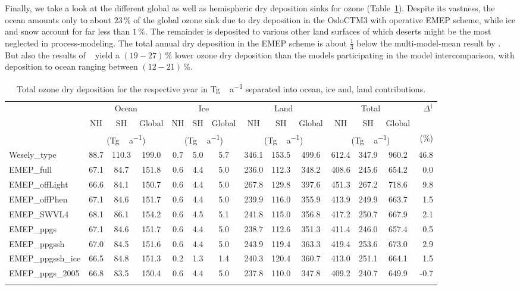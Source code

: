 \documentclass[gmd, manuscript]{copernicus}
\begin{document}
Finally, we take a look at the different global as well as hemispheric dry deposition sinks for ozone (Table~\ref{tab:ozone_sinks}). Despite its vastness, the ocean amounts only to about $23\,\unit{\%}$ of the global ozone sink due to dry deposition in the OsloCTM3 with operative EMEP scheme, while ice and snow account for far less than $1\,\unit{\%}$. The remainder is deposited to various other land surfaces of which deserts might be the most neglected in process-modeling. The total annual dry deposition in the EMEP scheme is about $\frac{1}{3}$ below the multi-model-mean result by \citet{ACP:Hardacre2015}. But also the results of ~\citet{ACP:Luhar2017} yield a $(19-27)\,\unit{\%}$ lower ozone dry deposition than the models participating in the model intercomparison, with deposition to ocean ranging between $(12-21)\,\unit{\%}$.
%
\begin{table}[t]
\caption{Total ozone dry deposition for the respective year in \unit{Tg\,a^{-1}} separated into ocean, ice and, land contributions.}
\begin{tabular}{lccccccccccccr}
\tophline
\multirow{3}{*}{Simulation} & \multicolumn{3}{c}{Ocean} & \multicolumn{3}{c}{Ice} & \multicolumn{3}{c}{Land} & \multicolumn{3}{c}{Total} & $\Delta^\dagger$\\
& NH & SH & Global & NH & SH & Global & NH & SH & Global & NH & SH & Global\\
& \multicolumn{3}{c}{(\unit{Tg\,a^{-1}})} & \multicolumn{3}{c}{(\unit{Tg\,a^{-1}})} & \multicolumn{3}{c}{(\unit{Tg\,a^{-1}})} & \multicolumn{3}{c}{(\unit{Tg\,a^{-1}})} & (\unit{\%})\\
\middlehline
Wesely\_type & 88.7 & 110.3 & 199.0 & 0.7 & 5.0 & 5.7 & 346.1 & 153.5 & 499.6 & 612.4 & 347.9 & 960.2 & 46.8\\
EMEP\_full & 67.1 & 84.7 & 151.8 & 0.6 & 4.4 & 5.0 & 236.0 & 112.3 & 348.2 & 408.6 & 245.6 & 654.2 & 0.0\\
EMEP\_offLight & 66.6 & 84.1 & 150.7 & 0.6 & 4.4 & 5.0 & 267.8 & 129.8 & 397.6 & 451.3 & 267.2 & 718.6 & 9.8\\
EMEP\_offPhen & 67.1 & 84.6 & 151.7 & 0.6 & 4.4 & 5.0 & 239.9 & 116.0 & 355.9 & 413.9 & 249.9 & 663.7 & 1.5\\
EMEP\_SWVL4 & 68.1 & 86.1 & 154.2 & 0.6 & 4.5 & 5.1 & 241.8 & 115.0 & 356.8 & 417.2 & 250.7 & 667.9 & 2.1\\
EMEP\_ppgs & 67.1 & 84.6 & 151.7 & 0.6 & 4.4 & 5.0 & 238.7 & 112.6 & 351.3 & 411.4 & 246.0 & 657.4 & 0.5\\
EMEP\_ppgssh & 67.0 & 84.5 & 151.6 & 0.6 & 4.4 & 5.0 & 243.9 & 119.4 & 363.3 & 419.4 & 253.6 & 673.0 & 2.9\\
EMEP\_ppgssh\_ice & 66.5 & 84.8 & 151.3 & 0.2 & 1.3 & 1.4 & 240.3 & 120.4 & 360.7 & 413.0 & 251.1 & 664.1 & 1.5\\
EMEP\_ppgs\_2005 & 66.8 & 83.5 & 150.4 & 0.6 & 4.4 & 5.0 & 237.8 & 110.0 & 347.8 & 409.2 & 240.7 & 649.9 & -0.7\\
\bottomhline
\end{tabular}
\label{tab:ozone_sinks}
\end{table}
%
\end{document}
